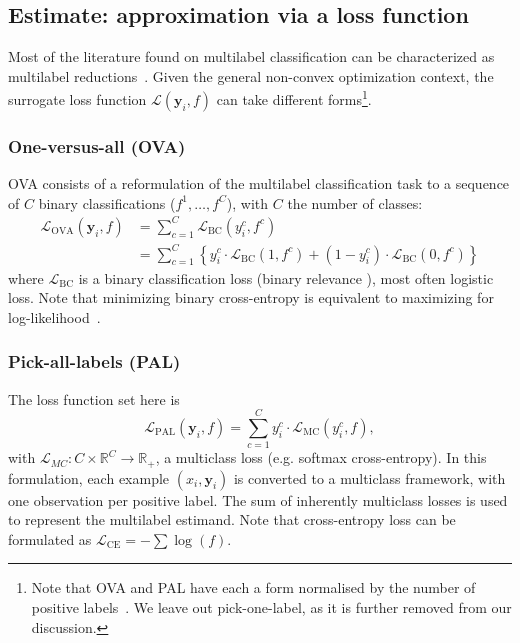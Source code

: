 \subsection{Estimate: approximation via a loss function}
\label{section:background:estimate}

Most of the literature found on multilabel classification can be characterized as multilabel reductions~\cite{multilabelReduction}. Given the general non-convex optimization context, the surrogate loss function $\mathcal{L}(\mathbf{y}_i, f)$ can take different forms\footnote{Note that OVA and PAL have each a form normalised by the number of positive labels~\cite{multilabelReduction}. We leave out pick-one-label, as it is further removed from our discussion.}. 

\subsubsection*{One-versus-all (OVA)}
OVA consists of a reformulation of the multilabel classification task to a sequence of $C$ binary classifications ($f^1, \ldots, f^C$), with $C$ the number of classes:
%
\begin{equation}
\begin{aligned}
\mathcal{L}_{\mathrm{OVA}}(\mathbf{y}_i, f) &= \sum_{c = 1}^C \mathcal{L}_{\mathrm{BC}}\left(y_i^{c}, f^{c}\right)\\
&=\sum_{c = 1}^C \left\{y_{i}^c \cdot \mathcal{L}_{\mathrm{BC}}\left(1, f^c \right)+\left(1-y_{i}^c \right) \cdot \mathcal{L}_{\mathrm{BC}}\left(0, f^c \right)\right\}
\end{aligned}
\end{equation}
%
where $\mathcal{L}_{\mathrm{BC}}$ is a binary classification loss (binary relevance \cite{OVA1, hammingLoss, OVA2}), most often logistic loss.  Note that minimizing binary cross-entropy is equivalent to maximizing for log-likelihood~\cite[\S4.3.4]{Bishop}.

\subsubsection*{Pick-all-labels (PAL)}
The loss function set here is
%
\vspace{-0.5\baselineskip}
\begin{equation}
\mathcal{L}_{\mathrm{PAL}}(\mathbf{y}_i, f) = \sum_{c = 1}^C y_{i}^c \cdot \mathcal{L}_{\mathrm{MC}}(y_i^c, f),
\end{equation}
%
with $\mathcal{L}_{MC} : C \times \mathbb{R}^{C} \rightarrow \mathbb{R}_{+}$, a multiclass loss (e.g. softmax cross-entropy). In this formulation, each example $(x_i, \mathbf{y}_i)$ is converted to a multiclass framework, with one observation per positive label. The sum of inherently multiclass losses is used to represent the multilabel estimand. Note that cross-entropy loss can be formulated as \(\mathcal{L}_{\text {CE}}=-\sum \log \left(f \right)\).

